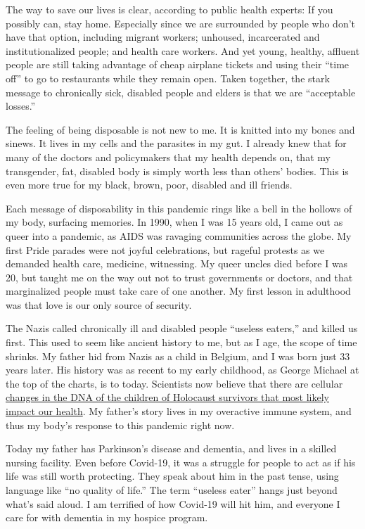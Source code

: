 The way to save our lives is clear, according to public health experts:
If you possibly can, stay home. Especially since we are surrounded by
people who don't have that option, including migrant workers; unhoused,
incarcerated and institutionalized people; and health care workers. And
yet young, healthy, affluent people are still taking advantage of cheap
airplane tickets and using their ``time off'' to go to restaurants while
they remain open. Taken together, the stark message to chronically sick,
disabled people and elders is that we are ``acceptable losses.''

The feeling of being disposable is not new to me. It is knitted into my
bones and sinews. It lives in my cells and the parasites in my gut. I
already knew that for many of the doctors and policymakers that my
health depends on, that my transgender, fat, disabled body is simply
worth less than others' bodies. This is even more true for my black,
brown, poor, disabled and ill friends.

Each message of disposability in this pandemic rings like a bell in the
hollows of my body, surfacing memories. In 1990, when I was 15 years
old, I came out as queer into a pandemic, as AIDS was ravaging
communities across the globe. My first Pride parades were not joyful
celebrations, but rageful protests as we demanded health care, medicine,
witnessing. My queer uncles died before I was 20, but taught me on the
way out not to trust governments or doctors, and that marginalized
people must take care of one another. My first lesson in adulthood was
that love is our only source of security.

The Nazis called chronically ill and disabled people ``useless eaters,''
and killed us first. This used to seem like ancient history to me, but
as I age, the scope of time shrinks. My father hid from Nazis as a child
in Belgium, and I was born just 33 years later. His history was as
recent to my early childhood, as George Michael at the top of the
charts, is to today. Scientists now believe that there are cellular
\href{https://www.theatlantic.com/health/archive/2018/10/trauma-inherited-generations/573055/}{changes
in the DNA of the children of Holocaust survivors that most likely
impact our health}. My father's story lives in my overactive immune
system, and thus my body's response to this pandemic right now.

Today my father has Parkinson's disease and dementia, and lives in a
skilled nursing facility. Even before Covid-19, it was a struggle for
people to act as if his life was still worth protecting. They speak
about him in the past tense, using language like ``no quality of life.''
The term ``useless eater'' hangs just beyond what's said aloud. I am
terrified of how Covid-19 will hit him, and everyone I care for with
dementia in my hospice program.

